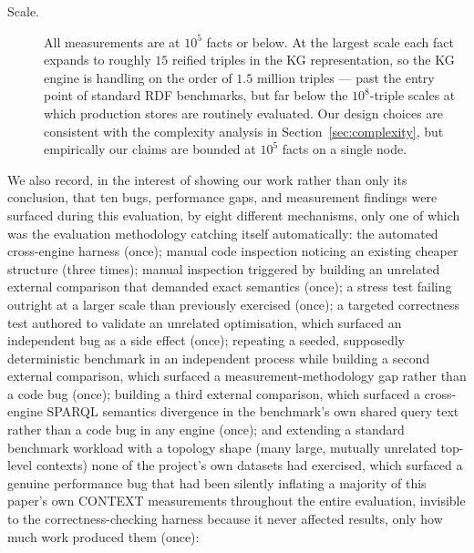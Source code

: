 \begin{description}
    \item[Scale.] All measurements are at $10^5$ facts or below. At the
          largest scale each fact expands to roughly $15$ reified triples
          in the KG representation, so the KG engine is handling on the
          order of $1.5$ million triples --- past the entry point of
          standard RDF benchmarks, but far below the $10^8$-triple scales
          at which production stores are routinely evaluated. Our design
          choices are consistent with the complexity analysis in
          Section~\ref{sec:complexity}, but empirically our claims are
          bounded at $10^5$ facts on a single node.
\end{description}

We also record, in the interest of showing our work rather than only its
conclusion, that ten bugs, performance gaps, and measurement findings
were surfaced
during this evaluation, by eight different mechanisms, only one of which
was the evaluation methodology catching itself automatically: the
automated cross-engine harness (once); manual code inspection noticing
an existing cheaper structure (three times); manual inspection triggered
by building an unrelated external comparison that demanded exact
semantics (once); a stress test failing outright at a larger scale than
previously exercised (once); a targeted correctness test authored to
validate an unrelated optimisation, which surfaced an independent bug as
a side effect (once); repeating a seeded, supposedly deterministic
benchmark in an independent process while building a second external
comparison, which surfaced a measurement-methodology gap rather than a
code bug (once); building a third external comparison, which
surfaced a cross-engine SPARQL semantics divergence in the benchmark's
own shared query text rather than a code bug in any engine (once); and
extending a standard benchmark workload with a topology shape (many
large, mutually unrelated top-level contexts) none of the project's own
datasets had exercised, which surfaced a genuine performance bug that
had been silently inflating a majority of this paper's own CONTEXT
measurements throughout the entire evaluation, invisible to the
correctness-checking harness because it never affected results, only
how much work produced them (once):


